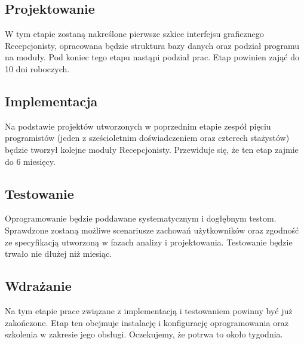 \documentclass [11pt, a4paper, leqno] {article}
\begin{document}
\subsection{Projektowanie}
\noindent
W tym etapie zostaną nakreślone pierwsze szkice interfejsu graficznego Recepcjonisty, opracowana będzie struktura bazy danych oraz podział programu na moduły. Pod koniec tego etapu nastąpi podział prac. Etap powinien zająć do 10 dni roboczych.

\subsection{Implementacja}
\noindent
Na podstawie projektów utworzonych w poprzednim etapie zespół pięciu programistów (jeden z sześcioletnim doświadczeniem oraz czterech stażystów) będzie tworzył kolejne moduły Recepcjonisty. Przewiduje się, że ten etap zajmie do 6 miesięcy.

\subsection{Testowanie}
\noindent
Oprogramowanie będzie poddawane systematycznym i dogłębnym testom. 
Sprawdzone zostaną możliwe scenariusze zachowań użytkowników oraz zgodność ze specyfikacją utworzoną w fazach analizy i projektowania. Testowanie będzie trwało nie dłużej niż miesiąc.

\subsection{Wdrażanie}
\noindent
Na tym etapie prace związane z implementacją i testowaniem powinny być już zakończone. Etap ten obejmuje instalację i konfigurację oprogramowania oraz szkolenia w zakresie jego obsługi. Oczekujemy, że potrwa to około tygodnia.
\end{document}
